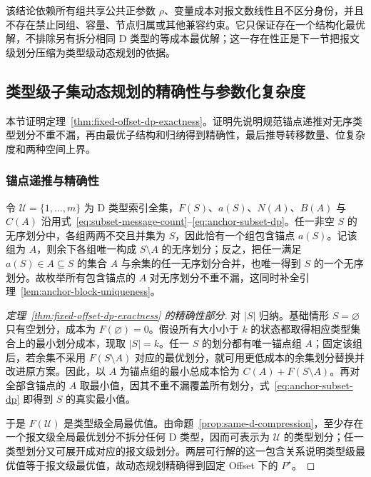 \documentclass[UTF8,a4paper,twoside,zihao=-4]{ctexart}
\numberwithin{equation}{section}
\numberwithin{figure}{section}
\numberwithin{table}{section}
\theoremstyle{definition}
\numberwithin{algocf}{section}
\begin{document}
该结论依赖所有组共享公共正参数 $\rho$、变量成本对报文数线性且不区分身份，并且不存在禁止同组、容量、节点归属或其他兼容约束。它只保证存在一个结构化最优解，不排除另有拆分相同 D 类型的等成本最优解；这一存在性正是下一节把报文级划分压缩为类型级动态规划的依据。

\subsection{类型级子集动态规划的精确性与参数化复杂度}
\label{subsec:appendix-dp-proof}

本节证明定理~\ref{thm:fixed-offset-dp-exactness}。证明先说明规范锚点递推对无序类型划分不重不漏，再由最优子结构和归纳得到精确性，最后推导转移数量、位复杂度和两种空间上界。

\subsubsection{锚点递推与精确性}
\label{subsubsec:appendix-anchor-proof}

令 $\mathcal U=\{1,\ldots,m\}$ 为 D 类型索引全集，$F(S)$、$a(S)$、$N(A)$、$B(A)$ 与 $C(A)$ 沿用式~\eqref{eq:subset-message-count}--\eqref{eq:anchor-subset-dp}。任一非空 $S$ 的无序划分中，各组两两不交且并集为 $S$，因此恰有一个组包含锚点 $a(S)$。记该组为 $A$，则余下各组唯一构成 $S\setminus A$ 的无序划分；反之，把任一满足 $a(S)\in A\subseteq S$ 的集合 $A$ 与余集的任一无序划分合并，也唯一得到 $S$ 的一个无序划分。故枚举所有包含锚点的 $A$ 对无序划分不重不漏，这同时补全引理~\ref{lem:anchor-block-uniqueness}。

\begin{proof}[定理~\ref{thm:fixed-offset-dp-exactness} 的精确性部分]
对 $|S|$ 归纳。基础情形 $S=\varnothing$ 只有空划分，成本为 $F(\varnothing)=0$。假设所有大小小于 $k$ 的状态都取得相应类型集合上的最小划分成本，现取 $|S|=k$。任一 $S$ 的划分都有唯一锚点组 $A$；固定该组后，若余集不采用 $F(S\setminus A)$ 对应的最优划分，就可用更低成本的余集划分替换并改进原方案。因此，以 $A$ 为锚点组的最小总成本恰为 $C(A)+F(S\setminus A)$。再对全部含锚点的 $A$ 取最小值，因其不重不漏覆盖所有划分，式~\eqref{eq:anchor-subset-dp} 即得到 $S$ 的真实最小值。

于是 $F(\mathcal U)$ 是类型级全局最优值。由命题~\ref{prop:same-d-compression}，至少存在一个报文级全局最优划分不拆分任何 D 类型，因而可表示为 $\mathcal U$ 的类型划分；任一类型划分又可展开成对应的报文级划分。两层可行解的这一包含关系说明类型级最优值等于报文级最优值，故动态规划精确得到固定 Offset 下的 $P^\star$。
\end{proof}
\end{document}

